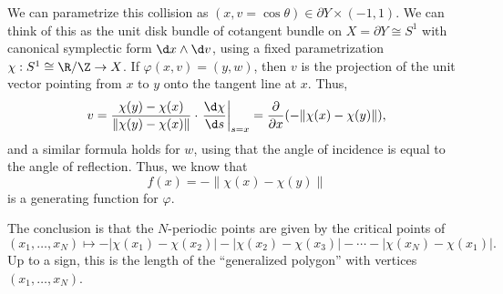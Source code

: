 \documentclass[a4paper]{article}
\begin{document}
\begin{eg}
\begin{center}
  \end{center}
  We can parametrize this collision as $(x, v = \cos \theta) \in \partial Y \times (-1, 1)$. We can think of this as the unit disk bundle of cotangent bundle on $X = \partial Y \cong S^1$ with canonical symplectic form $\d x \wedge \d v$, using a fixed parametrization $\chi: S^1 \cong \R/\Z \to X$. If $\varphi(x, v) = (y, w)$, then $v$ is the projection of the unit vector pointing from $x$ to $y$ onto the tangent line at $x$. Thus,
  \[
    v = \frac{\chi(y) - \chi(x)}{\|\chi(y) - \chi(x)\|} \cdot \left.\frac{\d \chi}{\d s}\right|_{s = x} = \frac{\partial}{\partial x} (-\|\chi(x) - \chi(y)\|),
  \]
  and a similar formula holds for $w$, using that the angle of incidence is equal to the angle of reflection. Thus, we know that
  \[
    f(x) = -\|\chi(x) - \chi(y)\|
  \]
  is a generating function for $\varphi$.
%
%
%
%

  The conclusion is that the $N$-periodic points are given by the critical points of
  \[
    (x_1, \ldots, x_N) \mapsto - |\chi(x_1) - \chi(x_2)| - |\chi(x_2) - \chi(x_3)| - \cdots - |\chi(x_N) - \chi(x_1)|.
  \]
  Up to a sign, this is the length of the ``generalized polygon'' with vertices $(x_1, \ldots, x_N)$.
\end{eg}
\end{document}
